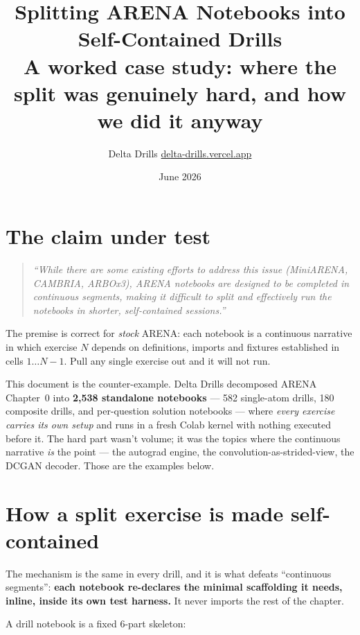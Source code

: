 \documentclass[11pt]{article}
\title{\color{accent}\bfseries Splitting ARENA Notebooks into\\ Self-Contained Drills\\[4pt]
\large\color{black}\normalfont A worked case study: where the split was genuinely hard, and how we did it anyway}
\author{Delta Drills \quad\textbar\quad \href{https://delta-drills.vercel.app}{delta-drills.vercel.app}}
\date{June 2026}
\begin{document}
\maketitle

\section*{The claim under test}

\begin{quote}
\itshape ``While there are some existing efforts to address this issue (MiniARENA, CAMBRIA,
ARBOx3), ARENA notebooks are designed to be completed in continuous segments, making it
difficult to split and effectively run the notebooks in shorter, self-contained sessions.''
\end{quote}

The premise is correct for \emph{stock} ARENA: each notebook is a continuous narrative in
which exercise $N$ depends on definitions, imports and fixtures established in cells
$1\ldots N{-}1$. Pull any single exercise out and it will not run.

This document is the counter-example. Delta Drills decomposed ARENA Chapter~0 into
\textbf{2{,}538 standalone notebooks} --- 582 single-atom drills, 180 composite drills, and
per-question solution notebooks --- where \emph{every exercise carries its own setup} and
runs in a fresh Colab kernel with nothing executed before it. The hard part wasn't volume;
it was the topics where the continuous narrative \emph{is} the point --- the autograd engine,
the convolution-as-strided-view, the DCGAN decoder. Those are the examples below.

\section{How a split exercise is made self-contained}

The mechanism is the same in every drill, and it is what defeats ``continuous segments'':
\textbf{each notebook re-declares the minimal scaffolding it needs, inline, inside its own
test harness.} It never imports the rest of the chapter.

A drill notebook is a fixed 6-part skeleton:
\end{document}
